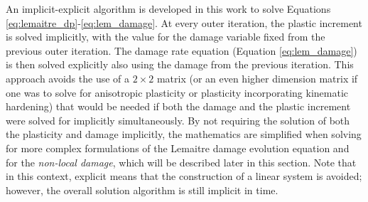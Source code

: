 \documentclass[sn-mathphys,Numbered,draft]{sn-jnl}%
\begin{document}
An implicit-explicit algorithm is developed in this work to solve Equations \ref{eq:lemaitre_dp}-\ref{eq:lem_damage}.
At every outer iteration, the plastic increment is solved implicitly, with the value for the damage variable fixed from the previous outer iteration.
The damage rate equation (Equation \ref{eq:lem_damage}) is then solved explicitly also using the damage from the previous iteration.
This approach avoids the use of a $2 \times 2$ matrix (or an even higher dimension matrix if one was to solve for anisotropic plasticity or plasticity incorporating kinematic hardening) that would be needed if both the damage and the plastic increment were solved for implicitly simultaneously.
By not requiring the solution of both the plasticity and damage implicitly, the mathematics are simplified when solving for more complex formulations of the Lemaitre damage evolution equation and for the \emph{non-local damage}, which will be described later in this section.
Note that in this context, explicit means that the construction of a linear system is avoided; however, the overall solution algorithm is still implicit in time.

%


\end{document}
